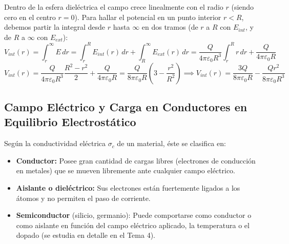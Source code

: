 \begin{ejercicio}
\begin{equation}
\end{equation}
Dentro de la esfera dieléctrica el campo crece linealmente con el radio $r$ (siendo cero en el centro $r=0$). Para hallar el potencial en un punto interior $r < R$, debemos partir la integral desde $r$ hasta $\infty$ en dos tramos (de $r$ a $R$ con $E_{int}$, y de $R$ a $\infty$ con $E_{ext}$):
\begin{equation}
    V_{int}(r) = \int_r^\infty E\, dr = \int_r^R E_{int}(r)\, dr + \int_R^\infty E_{ext}(r)\, dr = \frac{Q}{4\pi\varepsilon_0 R^3} \int_r^R r\, dr + \frac{Q}{4\pi\varepsilon_0 R}
\end{equation}
\begin{equation}
    V_{int}(r) = \frac{Q}{4\pi\varepsilon_0 R^3} \frac{R^2 - r^2}{2} + \frac{Q}{4\pi\varepsilon_0 R} = \frac{Q}{8\pi\varepsilon_0 R} \left(3 - \frac{r^2}{R^2}\right) \implies \boxed{V_{int}(r) = \frac{3 Q}{8\pi\varepsilon_0 R} - \frac{Q r^2}{8\pi\varepsilon_0 R^3}}
\end{equation}
\end{ejercicio}

\subsection{Campo Eléctrico y Carga en Conductores en Equilibrio Electrostático}

Según la conductividad eléctrica $\sigma_c$ de un material, éste se clasifica en:
\begin{itemize}[leftmargin=*]
    \item \textbf{Conductor:} Posee gran cantidad de cargas libres (electrones de conducción en metales) que se mueven libremente ante cualquier campo eléctrico.
    \item \textbf{Aislante o dieléctrico:} Sus electrones están fuertemente ligados a los átomos y no permiten el paso de corriente.
    \item \textbf{Semiconductor} (silicio, germanio): Puede comportarse como conductor o como aislante en función del campo eléctrico aplicado, la temperatura o el dopado (se estudia en detalle en el Tema 4).
\end{itemize}

